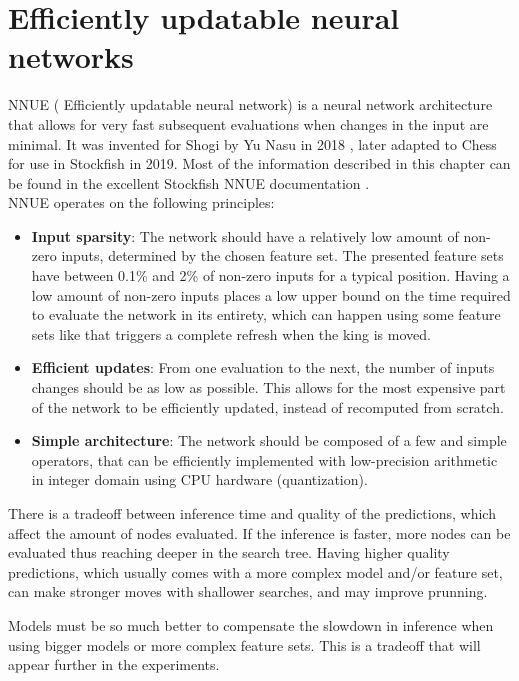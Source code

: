 \section{Efficiently updatable neural networks}

NNUE ( Efficiently updatable neural network) is a neural network architecture that allows for very fast subsequent evaluations when changes in the input are minimal. It was invented for Shogi by Yu Nasu in 2018 \cite{nnue:2018}, later adapted to Chess for use in Stockfish in 2019. Most of the information described in this chapter can be found in the excellent Stockfish NNUE documentation \cite{nnue-pytorch}. \\

NNUE operates on the following principles:

\begin{itemize}
    \item \textbf{Input sparsity}: The network should have a relatively low amount of non-zero inputs, determined by the chosen feature set. The presented feature sets have between 0.1\% and 2\% of non-zero inputs for a typical position. Having a low amount of non-zero inputs places a low upper bound on the time required to evaluate the network in its entirety, which can happen using some feature sets like  that triggers a complete refresh when the king is moved.
    \item \textbf{Efficient updates}: From one evaluation to the next, the number of inputs changes should be as low as possible. This allows for the most expensive part of the network to be efficiently updated, instead of recomputed from scratch.
    \item \textbf{Simple architecture}: The network should be composed of a few and simple operators, that can be efficiently implemented with low-precision arithmetic in integer domain using CPU hardware (quantization).

\end{itemize}

There is a tradeoff between inference time and quality of the predictions, which affect the amount of nodes evaluated. If the inference is faster, more nodes can be evaluated thus reaching deeper in the search tree. Having higher quality predictions, which usually comes with a more complex model and/or feature set, can make stronger moves with shallower searches, and may improve prunning.

Models must be so much better to compensate the slowdown in inference when using bigger models or more complex feature sets. This is a tradeoff that will appear further in the experiments.

